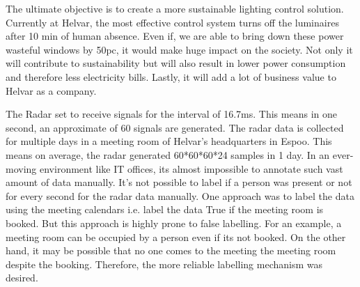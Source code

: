 The ultimate objective is to create a more sustainable lighting control solution. Currently at Helvar, the most effective control system turns off the luminaires after 10 min of human absence. Even if, we are able to bring down these power wasteful windows by 50pc, it would make huge impact on the society. Not only it will contribute to sustainability but will also result in lower power consumption and therefore less electricity bills. Lastly, it will add a lot of business value to Helvar as a company.





The Radar set to receive signals for the interval of 16.7ms. This means in one second, an approximate of 60 signals are generated. The radar data is collected for multiple days in a meeting room of Helvar’s headquarters in Espoo. This means on average, the radar generated 60*60*60*24 samples in 1 day. In an ever-moving environment like IT offices, its almost impossible to annotate such vast amount of data manually. It’s not possible to label if a person was present or not for every second for the radar data manually.  One approach was to label the data using the meeting calendars i.e. label the data True if the meeting room is booked. But this approach is highly prone to false labelling. For an example, a meeting room can be occupied by a person even if its not booked. On the other hand, it may be possible that no one comes to the meeting the meeting room despite the booking. Therefore, the more reliable labelling mechanism was desired.

